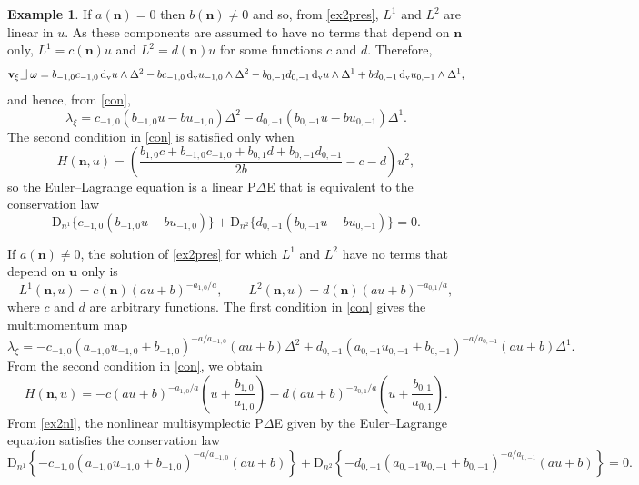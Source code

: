 \documentclass[11pt]{article} %
\numberwithin{equation}{section}
\newcommand{\intpsym}{\,\, \setlength{\unitlength}{0.4mm}
	\begin{picture}(0, 0)(5, 5)%
	\put(0, 4){\line(1,0){5}} \put(5,4){\line(0,1){8}}
	\end{picture}\,\,}
\newcommand{\intp}{\,\,\intpsym}
\newcommand{\upd}{\operatorname{d}}
\newcommand{\upv}{\operatorname{v}}
\newcommand{\dv}{\upd_{\upv}\!}
\newcommand{\diff}[1]{\mathrm{D}_{n^{#1}}}
\newcommand{\mbn}{\mathbf{n}}
\newcommand{\mbu}{\mathbf{u}}
\newcommand{\mbv}{\mathbf{v}}
\theoremstyle{plain}
\theoremstyle{definition}
\newtheorem{exm}[defn]{Example}
\begin{document}
\begin{exm}
If $a(\mbn)=0$ then $b(\mbn)\neq 0$ and so, from \eqref{ex2pres}, $L^1$ and $L^2$ are linear in $u$. As these components are assumed to have no terms that depend on $\mbn$ only, $L^1=c(\mbn)u$ and $L^2=d(\mbn)u$ for some functions $c$ and $d$. 
Therefore,
\begin{equation}
\mbv_\xi\intp\omega=b_{-1,0}c_{-1,0}\dv u\wedge\Delta^2-bc_{-1,0}\dv u_{-1,0}\wedge\Delta^2-b_{0,-1}d_{0,-1}\dv u\wedge\Delta^1+bd_{0,-1}\dv u_{0,-1}\wedge\Delta^1,
\end{equation}
and hence, from \eqref{con},
\begin{equation}
\lambda_{\xi}=c_{-1,0}(b_{-1,0} u-bu_{-1,0})\Delta^2-d_{0,-1}(b_{0,-1} u-bu_{0,-1})\Delta^1.
\end{equation}
The second condition in \eqref{con} is satisfied only when 
\begin{equation}
H(\mbn,u)=\left(\frac{b_{1,0}c+b_{-1,0}c_{-1,0}+b_{0,1}d+b_{0,-1}d_{0,-1}}{2b}-c-d\right)u^2,
\end{equation}
so the Euler--Lagrange equation is a linear P$\Delta$E that is equivalent to the conservation law
\begin{equation}
\diff{1}\{c_{-1,0}(b_{-1,0} u-bu_{-1,0})\}+\diff{2}\{d_{0,-1}(b_{0,-1} u-bu_{0,-1})\}=0.
\end{equation}


If $a(\mbn)\neq  0$, the solution of \eqref{ex2pres} for which $L^1$ and $L^2$ have no terms that depend on $\mbu$ only is
\begin{equation}
L^1(\mbn,u)=c(\mbn)(au+b)^{-a_{1,0}/a},\qquad L^2(\mbn,u)=d(\mbn)(au+b)^{-a_{0,1}/a},
\end{equation}
where $c$ and $d$ are arbitrary functions. The first condition in \eqref{con} gives the multimomentum map
\begin{equation}\label{ex2nl}
    \lambda_\xi=-c_{-1,0}(a_{-1,0}u_{-1,0}+b_{-1,0})^{-a/a_{-1,0}}(au+b)\Delta^2+d_{0,-1}(a_{0,-1}u_{0,-1}+b_{0,-1})^{-a/a_{0,-1}}(au+b)\Delta^1.
\end{equation}
From the second condition in \eqref{con}, we obtain
\begin{equation}
H(\mbn,u)=-c(au+b)^{-a_{1,0}/a}\left(u+\frac{b_{1,0}}{a_{1,0}}\right)-d(au+b)^{-a_{0,1}/a}\left(u+\frac{b_{0,1}}{a_{0,1}}\right).
\end{equation}
From \eqref{ex2nl}, the nonlinear multisymplectic P$\Delta$E given by the Euler--Lagrange equation satisfies the conservation law
\begin{equation}
\diff{1}\!\left\{-c_{-1,0}(a_{-1,0}u_{-1,0}\!+\!b_{-1,0})^{-a/a_{-1,0}}(au\!+\!b)\right\}+\diff{2}\!\left\{-d_{0,-1}(a_{0,-1}u_{0,-1}\!+\!b_{0,-1})^{-a/a_{0,-1}}(au\!+\!b)\right\}=0.
\end{equation}
\end{exm}
\end{document}
